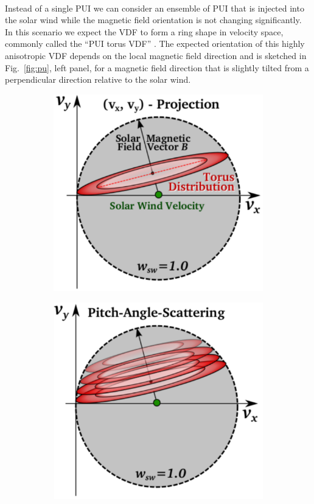 \\
Instead of a single PUI we can consider an ensemble of PUI that is injected into the solar wind while the magnetic field orientation is not changing significantly. In this scenario we expect the VDF to form a ring shape in velocity space, commonly called the ``PUI torus VDF'' \citep{oka_2002}. The expected orientation of this highly anisotropic VDF depends on the local magnetic field direction and is sketched in Fig.~\ref{fig:pu}, left panel, for a magnetic field direction that is slightly tilted from a perpendicular direction relative to the solar wind.
\begin{figure}
	\centering
	\begin{subfigure}{.32\textwidth}
		\centering
		\includegraphics[width=1.\linewidth]{Figures/torus.pdf}
	\end{subfigure}%
	\begin{subfigure}{.32\textwidth}
		\centering
		\includegraphics[width=1.\linewidth]{Figures/PAS.pdf}

\end{subfigure}
\end{figure}
